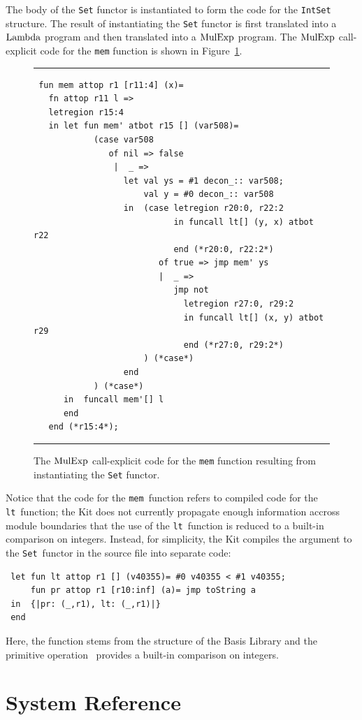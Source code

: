 \documentclass[12pt]{book}
\begin{document}
The body of the {\tt Set} functor is instantiated to form the code for
the {\tt IntSet} structure. The result of instantiating the {\tt Set}
functor is first translated into a $\hbox{\rm Lambda}$ program and then
translated into a $\hbox{\rm MulExp}$ program. The $\hbox{\rm MulExp}$ call-explicit code for the {\tt mem} function is shown in
Figure~\ref{set_inst_mulexp.fig}.
\begin{figure}[ht]
\hrule \medskip
\begin{verbatim}
 fun mem attop r1 [r11:4] (x)= 
   fn attop r11 l => 
   letregion r15:4 
   in let fun mem' atbot r15 [] (var508)= 
            (case var508 
               of nil => false
                |  _ => 
                  let val ys = #1 decon_:: var508; 
                      val y = #0 decon_:: var508
                  in  (case letregion r20:0, r22:2 
                            in funcall lt[] (y, x) atbot r22 
                            end (*r20:0, r22:2*)
                         of true => jmp mem' ys
                         |  _ => 
                            jmp not 
                              letregion r27:0, r29:2 
                              in funcall lt[] (x, y) atbot r29 
                              end (*r27:0, r29:2*)
                      ) (*case*) 
                  end 
            ) (*case*) 
      in  funcall mem'[] l
      end  
   end (*r15:4*); 
\end{verbatim}
\caption{The $\hbox{\rm MulExp}$ call-explicit code for the {\tt mem} function resulting 
from instantiating the {\tt Set} functor.}
\medskip \hrule \label{set_inst_mulexp.fig} 
\end{figure}

Notice that the code for the {\tt mem}~function refers to compiled
code for the {\tt lt}~function; the Kit does not currently
propagate enough information accross module boundaries that the use of
the {\tt lt}~function is reduced to a built-in comparison on
integers. Instead, for simplicity, the Kit compiles the argument to
the {\tt Set}~functor in the source file  into
separate code:
\begin{verbatim}
 let fun lt attop r1 [] (v40355)= #0 v40355 < #1 v40355; 
     fun pr attop r1 [r10:inf] (a)= jmp toString a
 in  {|pr: (_,r1), lt: (_,r1)|}
 end 
\end{verbatim}
Here, the  function stems from the 
structure of the Basis Library and the primitive operation~\boxml{<} provides a built-in comparison
on integers.

\part{System Reference}
%
\end{document}
